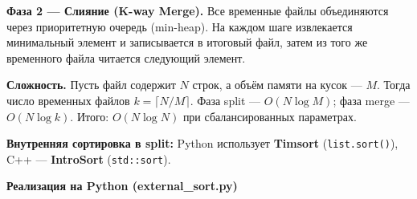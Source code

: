 \documentclass[oneside,a4paper,14pt]{extarticle}
\begin{document}
\begin{flushleft}
\textbf{Фаза 2 --- Слияние (K-way Merge).} Все временные файлы объединяются через приоритетную очередь (min-heap). На каждом шаге извлекается минимальный элемент и записывается в итоговый файл, затем из того же временного файла читается следующий элемент.

\textbf{Сложность.} Пусть файл содержит $N$ строк, а объём памяти на кусок --- $M$. Тогда число временных файлов $k = \lceil N/M \rceil$. Фаза split --- $O(N \log M)$; фаза merge --- $O(N \log k)$. Итого: $O(N \log N)$ при сбалансированных параметрах.

\textbf{Внутренняя сортировка в split:} Python использует \textbf{Timsort} (\texttt{list.sort()}), C++ --- \textbf{IntroSort} (\texttt{std::sort}).
\end{flushleft}

\newpage
\textbf{Реализация на Python (external\_sort.py)}
\small
\end{document}
